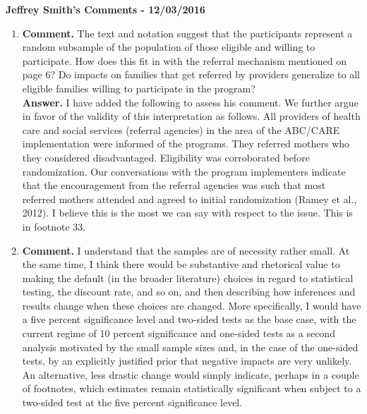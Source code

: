 


\usepackage[stable]{footmisc}

\newcommand*\leftright[2]{%
  \leavevmode
  \rlap{#1}%
  \hspace{0.5\linewidth}%
  #2}

\newcommand{\orth}{\ensuremath{\perp\!\!\!\perp}}%
\newcommand{\indep}{\orth}%
\newcommand{\notorth}{\ensuremath{\perp\!\!\!\!\!\!\diagup\!\!\!\!\!\!\perp}}%
\newcommand{\notindep}{\notorth}





\doublespacing

\noindent \textbf{Jeffrey Smith's Comments - 12/03/2016}

\begin{enumerate}

\item 

\noindent \textbf{Comment.} The text and notation suggest that the participants represent a random subsample of the population of those eligible and willing to participate. How does this fit in with the referral mechanism mentioned on page 6? Do impacts on families that get referred by providers generalize to all eligible families willing to participate in the program? \\

\noindent \textbf{Answer.} I have added the following to assess his comment. We further argue in favor of the validity of this interpretation as follows. All providers of health care and social services (referral agencies) in the area of the ABC/CARE implementation were informed of the programs. They referred mothers who they considered disadvantaged. Eligibility was corroborated before randomization. Our conversations with the program implementers indicate that the encouragement from the referral agencies was such that most referred mothers attended and agreed to initial randomization (Ramey et al., 2012). I believe this is the most we can say with respect to the issue. This is in footnote 33.\\

\item
\noindent \textbf{Comment.} I understand that the samples are of necessity rather small. At the same time, I think there would be substantive and rhetorical value to making the default (in the broader literature) choices in regard to statistical testing, the discount rate, and so on, and then describing how inferences and results change when these choices are changed. More specifically, I would have a five percent significance level and two-sided tests as the base case, with the current regime of 10 percent significance and one-sided tests as a second analysis motivated by the small sample sizes and, in the case of the one-sided tests, by an explicitly justified prior that negative impacts are very unlikely. An alternative, less drastic change would simply indicate, perhaps in a couple of footnotes, which estimates remain statistically significant when subject to a two-sided test at the five percent significance level.\\


\end{enumerate}
